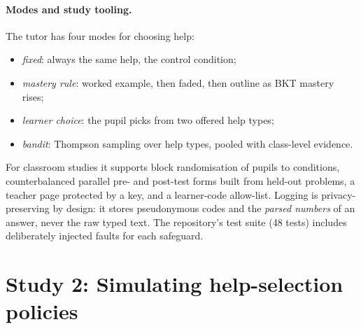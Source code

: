 \documentclass[11pt,a4paper]{article}
\begin{document}
\paragraph{Modes and study tooling.}
The tutor has four modes for choosing help:
\begin{itemize}
  \item \emph{fixed}: always the same help, the control condition;
  \item \emph{mastery rule}: worked example, then faded, then outline as BKT mastery rises;
  \item \emph{learner choice}: the pupil picks from two offered help types;
  \item \emph{bandit}: Thompson sampling over help types, pooled with class-level evidence.
\end{itemize}
For classroom studies it supports block randomisation of pupils to conditions,
counterbalanced parallel pre- and post-test forms built from held-out problems, a
teacher page protected by a key, and a learner-code allow-list. Logging is privacy-preserving
by design: it stores pseudonymous codes and the \emph{parsed numbers} of an answer, never
the raw typed text. The repository's test suite (48 tests) includes deliberately injected
faults for each safeguard.

\section{Study 2: Simulating help-selection policies}
\label{sec:study2}
\end{document}
